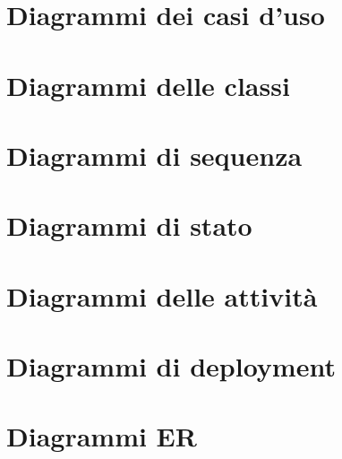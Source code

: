 \documentclass[12pt,a4paper,oneside]{report}
\begin{document}
\section{Diagrammi dei casi d'uso}
\section{Diagrammi delle classi}
\section{Diagrammi di sequenza}
\section{Diagrammi di stato}
\section{Diagrammi delle attività}
\section{Diagrammi di deployment}
\section{Diagrammi ER}
\end{document}
